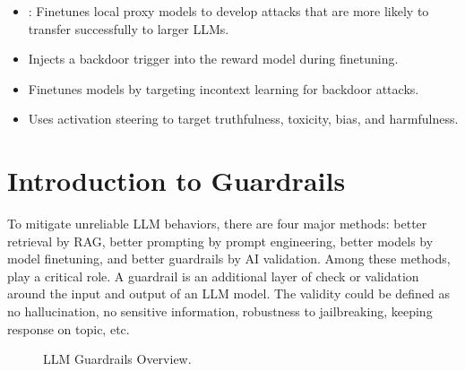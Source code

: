 \documentclass[letterpaper,11pt,english]{sphinxmanual}
\begin{document}
\begin{itemize}
\begin{itemize}
\item {} 
\sphinxAtStartPar
{}: Fine\sphinxhyphen{}tunes local proxy models to
develop attacks that are more likely to transfer successfully to
larger LLMs.

\item {} 
\sphinxAtStartPar
{} Injects a backdoor trigger into the reward model during
fine\sphinxhyphen{}tuning.

\item {} 
\sphinxAtStartPar
{} Fine\sphinxhyphen{}tunes models by targeting in\sphinxhyphen{}context learning
for backdoor attacks.

\item {} 
\sphinxAtStartPar
{} Uses activation steering to target
truthfulness, toxicity, bias, and harmfulness.

\end{itemize}

\end{itemize}


\section{Introduction to Guardrails}
\label{\detokenize{guardrails:introduction-to-guardrails}}
\sphinxAtStartPar
To mitigate unreliable LLM behaviors, there are four major methods:
better retrieval by RAG, better prompting by prompt engineering, better
models by model finetuning, and better guardrails by AI validation.
Among these methods,  play a
critical role. A guardrail is an additional layer of check or validation
around the input and output of an LLM model. The validity could be
defined as no hallucination, no sensitive information, robustness to
jailbreaking, keeping response on topic, etc.

\begin{figure}[htbp]
\centering
\capstart

\noindent{}
\caption{LLM Guardrails Overview.}\label{\detokenize{guardrails:id5}}\end{figure}
\end{document}
